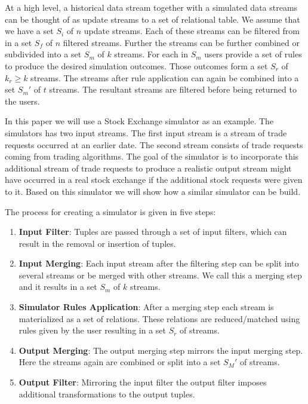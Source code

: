 \documentclass{article}
\begin{document}
At a high level, a historical data stream together with a simulated data streams can be thought of as update streams to a set of relational table. We assume that we have a set $S_i$ of $n$ update streams. Each of these streams can be filtered from in a set $S_f$ of $n$ filtered streams. Further the streams can be further combined or subdivided into a set $S_m$ of $k$ streams. For each in $S_m$ users provide a set of rules to produce the desired simulation outcomes. Those outcomes form a set $S_r$ of $k_r \geq k$ streams. The streams after rule application can again be combined into a set $S_m '$ of $t$ streams. The resultant streams are filtered before being returned to the users.
 
In this paper we will use a Stock Exchange simulator as an example. The simulators has two input streams. The first input stream is a stream of trade requests occurred at an earlier date. The second stream consists of trade requests coming from trading algorithms. The goal of the simulator is to incorporate this additional stream of trade requests to produce a realistic output stream might have occurred in a real stock exchange if the additional stock requests were given to it. Based on this simulator we will show how a similar simulator can be build. 


The process for creating a simulator is given in five steps:

\begin{enumerate}
    \item {\bf Input Filter}: Tuples are passed through a set of input filters, which can result in the removal or insertion of tuples. 
    \item {\bf Input Merging}: Each input stream after the filtering step can be split into several streams or be merged with other streams. We call this a merging step and it results in a set $S_m$ of $k$ streams. 
    \item {\bf Simulator Rules Application}: After a merging step each stream is materialized as a set of relations. These relations are reduced/matched using rules given by the user resulting in a set $S_r$ of streams.
    \item {\bf Output Merging}: The output merging step mirrors the input merging step. Here the streams again are combined or split into a set $S_M '$ of streams. 
    \item {\bf Output Filter}: Mirroring the input filter the output filter imposes additional transformations to the output tuples.
\end{enumerate}
\end{document}
